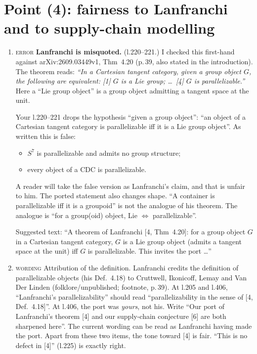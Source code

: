 \documentclass[11pt]{article}
\newcommand{\iss}[1]{\textsc{#1}}
\begin{document}
\section{Point (4): fairness to Lanfranchi and to supply-chain modelling}
\begin{enumerate}[label=\textbf{4.\arabic*},leftmargin=*]
\item \iss{error} \textbf{Lanfranchi is misquoted.} (l.220--221.) I checked this first-hand
against arXiv:2609.03449v1, Thm~4.20 (p.\,39, also stated in the introduction). The theorem reads:
\emph{``In a Cartesian tangent category, given a group object $G$, the following are equivalent:
[1] $G$ is a Lie group; \dots\ [4] $G$ is parallelizable.''} Here a ``Lie group object'' is a group
object admitting a tangent space at the unit.

Your l.220--221 drops the hypothesis ``given a group object'': ``an object of a Cartesian tangent
category is parallelizable iff it is a Lie group object''. As written this is false:
\begin{itemize}[leftmargin=1.2em]
\item $S^7$ is parallelizable and admits no group structure;
\item every object of a CDC is parallelizable.
\end{itemize}
A reader will take the false version as Lanfranchi's claim, and that is unfair to him. The ported
statement also changes shape. ``A container is parallelizable iff it is a groupoid'' is not the
analogue of his theorem. The analogue is ``for a group(oid) object, Lie $\Leftrightarrow$
parallelizable''.

Suggested text: ``A theorem of Lanfranchi [4, Thm~4.20]: for a group object $G$ in a Cartesian
tangent category, $G$ is a Lie group object (admits a tangent space at the unit) iff $G$ is
parallelizable. This invites the port \dots''

\item \iss{wording} Attribution of the definition. Lanfranchi credits the definition of
parallelizable objects (his Def.~4.18) to Cruttwell, Ikonicoff, Lemay and Van Der Linden
(folklore/unpublished; footnote, p.\,39). At l.205 and l.406, ``Lanfranchi's parallelizability''
should read ``parallelizability in the sense of [4, Def.~4.18]''. At l.406, the port was
\emph{yours}, not his. Write ``Our port of Lanfranchi's theorem [4] and our supply-chain
conjecture [6] are both sharpened here''. The current wording can be read as Lanfranchi having
made the port. Apart from these two items, the tone toward [4] is fair. ``This is no defect in
[4]'' (l.225) is exactly right.


\end{enumerate}
\end{document}
